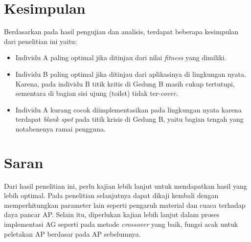\documentclass[12pt,a4paper]{report}
\begin{document}
		\section{Kesimpulan}
		Berdasarkan pada hasil pengujian dan analisis, terdapat beberapa kesimpulan dari penelitian ini yaitu:
		\begin{itemize}
			\item Individu A paling optimal jika ditinjau dari nilai \emph{fitness} yang dimiliki.
			\item Individu B paling optimal jika ditinjau dari aplikasinya di lingkungan nyata. Karena, pada individu B titik kritis di Gedung B masih cukup tertutupi, sementara di bagian sisi ujung (toilet) tidak ter-\emph{cover}.
			\item Individu A kurang cocok diimplementasikan pada lingkungan nyata karena terdapat \emph{blank spot} pada titik krisis di Gedung B, yaitu bagian tengah yang notabenenya ramai pengguna.
		\end{itemize}
		\section{Saran}
		Dari hasil penelitian ini, perlu kajian lebih lanjut untuk mendapatkan hasil yang lebih optimal. Pada penelitian selanjutnya dapat dikaji kembali dengan memperhitungkan parameter lain seperti pengaruh material dan cuaca terhadap daya pancar AP. Selain itu, diperlukan kajian lebih lanjut dalam proses implementasi AG seperti pada metode \emph{crossover} yang baik, fungsi acak untuk peletakan AP berdasar pada AP sebelumnya.
		\nocite{*}
		
		
\end{document}
